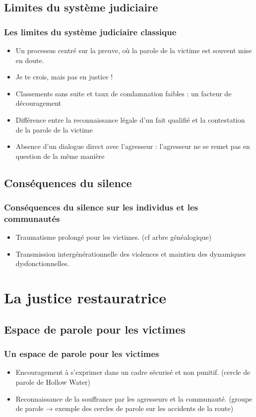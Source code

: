\documentclass[french]{beamer}
\begin{document}
\subsection{Limites du système judiciaire}
\begin{frame}
  \frametitle{Les limites du système judiciaire classique}
  \begin{itemize}
    \item Un processus centré sur la preuve, où la parole de la victime est souvent mise en doute.
    \item \og{}Je te crois\fg{}, mais pas en justice !
    \item Classements sans suite et taux de condamnation faibles : un facteur de découragement
    \item Différence entre la reconnaissance légale d’un fait qualifié et la contestation de la parole de la victime
    \item Absence d’un dialogue direct avec l’agresseur : l’agresseur ne se remet pas en question de la même manière
  \end{itemize}
\end{frame}

\subsection{Conséquences du silence}
\begin{frame}
  \frametitle{Conséquences du silence sur les individus et les communautés}
  \begin{itemize}
    \item Traumatisme prolongé pour les victimes. (cf arbre généalogique)
    \item Transmission intergénérationnelle des violences et maintien des dynamiques dysfonctionnelles.
  \end{itemize}
\end{frame}

\section{La justice restauratrice}
\subsection{Espace de parole pour les victimes}
\begin{frame}
  \frametitle{Un espace de parole pour les victimes}
  \begin{itemize}
    \item Encouragement à s’exprimer dans un cadre sécurisé et non punitif. (cercle de parole de Hollow Water)
    \item Reconnaissance de la souffrance par les agresseurs et la communauté. (groupe de parole → exemple des cercles de parole sur les accidents de la route)
  \end{itemize}
\end{frame}
\end{document}
